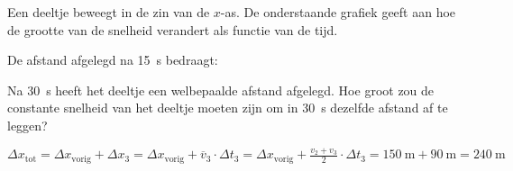 \documentclass{ximera}
\begin{document}
\begin{exercise}
Een deeltje beweegt in de zin van de $x$-as. De onderstaande grafiek geeft aan hoe de grootte van de snelheid verandert als functie van de tijd.
\begin{image}
    \end{image}



\begin{question}
De afstand afgelegd na \SI{15}{s} bedraagt:
\begin{feedback}
\end{feedback}
\end{question}

\begin{question}
Na \SI{30}{s} heeft het deeltje een welbepaalde afstand afgelegd. Hoe groot zou de constante snelheid van het deeltje moeten zijn om in \SI{30}{s} dezelfde afstand af te leggen?

\begin{feedback}
    \(\Delta x_{\text{tot}} = \Delta x_{\text{vorig}} + \Delta x_3 = \Delta x_{\text{vorig}} + \overline{v}_3 \cdot \Delta t_3  = \Delta x_{\text{vorig}} + \frac{v_2 + v_3}{2} \cdot \Delta t_3 = \SI{150}{\meter} + \SI{90}{\meter} = \SI{240}{\meter}\)


\end{feedback}
\end{question}
\end{exercise}
\end{document}
